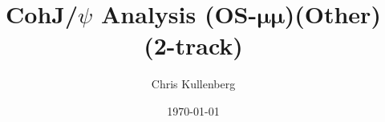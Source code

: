 \title{CohJ/$\psi$ Analysis (\textbf{OS}-$\boldsymbol{\mu\mu}$)(\textbf{Other})(\textbf{2-track})}
\author{Chris Kullenberg}
\date{\today}
